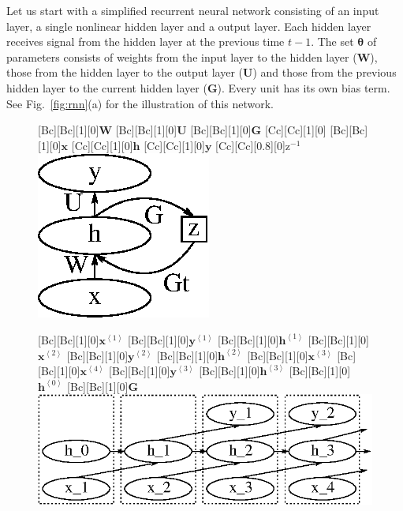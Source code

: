 \documentclass[dissertation,nocontribution,draft*]{aaltoseries}
\newcommand{\qt}[1]{\left<#1\right>}
\newcommand{\vect}[1]{\mathbf{#1}}
\newcommand{\vects}[1]{\boldsymbol{#1}}
\newcommand{\matr}[1]{\mathbf{#1}}
\newcommand{\vh}[0]{\vect{h}}
\newcommand{\vx}[0]{\vect{x}}
\newcommand{\vy}[0]{\vect{y}}
\newcommand{\mW}[0]{\matr{W}}
\newcommand{\mG}[0]{\matr{G}}
\newcommand{\mU}[0]{\matr{U}}
\newcommand{\TT}[0]{{\vects{\theta}}}
\begin{document}
Let us start with a simplified recurrent neural network
consisting of an input layer, a single nonlinear hidden
layer and a output layer. Each hidden layer receives signal
from the hidden layer at the previous time $t-1$. The set
$\TT$ of parameters consists of weights from the input layer
to the hidden layer ($\mW$), those from the hidden layer to
the output layer ($\mU$) and those from the previous hidden
layer to the current hidden layer ($\mG$).  Every unit has
its own bias term. See Fig.~\ref{fig:rnn}(a) for the
illustration of this network.

\begin{figure}[t]
    \begin{minipage}{0.40\textwidth}
        \centering
        [Bc][Bc][1][0]{$\mW$}
        [Bc][Bc][1][0]{$\mU$}
        [Bc][Bc][1][0]{$\mG$}
        [Cc][Cc][1][0]{}
        [Bc][Bc][1][0]{$\vx$}
        [Cc][Cc][1][0]{$\vh$}
        [Cc][Cc][1][0]{$\vy$}
        [Cc][Cc][0.8][0]{$\text{z}^{-1}$}
        \includegraphics[width=0.65\columnwidth]{figures/rnn.eps}
    \end{minipage}
    \begin{minipage}{0.58\textwidth}
        \centering
        [Bc][Bc][1][0]{$\vx^{\qt{1}}$}
        [Bc][Bc][1][0]{$\vy^{\qt{1}}$}
        [Bc][Bc][1][0]{$\vh^{\qt{1}}$}
        [Bc][Bc][1][0]{$\vx^{\qt{2}}$}
        [Bc][Bc][1][0]{$\vy^{\qt{2}}$}
        [Bc][Bc][1][0]{$\vh^{\qt{2}}$}
        [Bc][Bc][1][0]{$\vx^{\qt{3}}$}
        [Bc][Bc][1][0]{$\vx^{\qt{4}}$}
        [Bc][Bc][1][0]{$\vy^{\qt{3}}$}
        [Bc][Bc][1][0]{$\vh^{\qt{3}}$}
        [Bc][Bc][1][0]{$\vh^{\qt{0}}$}
        [Bc][Bc][1][0]{$\mG$}
        \includegraphics[width=\columnwidth]{figures/rnn_tf.eps}
    \end{minipage}


\end{figure}
\end{document}
